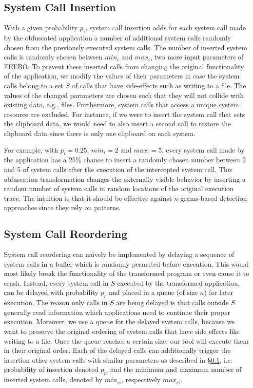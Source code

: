 \documentclass{llncs}
\begin{document}
\subsection{System Call Insertion} \label{subsec:insertion}
With a given probability $p_i$, system call insertion adds for each system call made by the obfuscated application a number of additional system calls randomly chosen from the previously executed system calls. The number of inserted system calls is randomly chosen between $\mathit{min_i}$ and $\mathit{max_i}$, two more input parameters of FEEBO. To prevent these inserted calls from changing the original functionality of the application, we modify the values of their parameters in case the system calls belong to a set $S$ of calls that have side-effects such as writing to a file. The values of the changed parameters are chosen such that they will not collide with existing data, e.g., files. Furthermore, system calls that access a unique system resource are excluded. For instance, if we were to insert the system call that sets the clipboard data, we would need to also insert a second call to restore the clipboard data since there is only one clipboard on each system. 

For example, with $p_i = 0.25$, $\mathit{min_i} = 2$ and $\mathit{max_i} = 5$, every system call made by the application has a 25\% chance to insert a randomly chosen number between 2 and 5 of system calls after the execution of the intercepted system call. This obfuscation transformation changes the externally visible behavior by inserting a random number of system calls in random locations of the original execution trace. The intuition is that it should be effective against $n$-grams-based detection approaches since they rely on patterns.

\subsection{System Call Reordering} \label{subsec:reordering} 
System call reordering can na\"{i}vely be implemented by delaying a sequence of system calls in a buffer which is randomly permuted before execution. This would most likely break the functionality of the transformed program or even cause it to crash. Instead, every system call in $S$ executed by the transformed application, can be delayed with probability $p_r$ and placed in a queue (of size $n$) for later execution. The reason only calls in $S$ are being delayed is that calls outside $S$ generally read information which applications need to continue their proper execution. Moreover, we use a queue for the delayed system calls, because we want to preserve the original ordering of system calls that have side effects like writing to a file. Once the queue reaches a certain size, our tool will execute them in their original order.
Each of the delayed calls can additionally trigger the insertion other system calls with similar parameters as described in \S\ref{subsec:insertion}, i.e. probability of insertion denoted $p_{ri}$ and the minimum and maximum number of inserted system calls, denoted by $\mathit{min}_{ri}$, respectively $\mathit{max}_{ri}$. 
\end{document}
